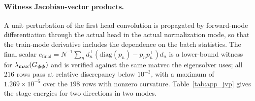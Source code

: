 \paragraph{Witness Jacobian-vector products.} A unit perturbation of the first
head convolution is propagated by forward-mode differentiation through the
actual head in the actual normalization mode, so that the train-mode derivative
includes the dependence on the batch statistics. The final scalar
$e_{\mathrm{final}} = N^{-1}\sum_n d_n^\top(\mathrm{diag}(p_n) - p_np_n^\top)d_n$
is a lower-bound witness for $\lambda_{\max}(G_{{\boldsymbol{\phi}}{\boldsymbol{\phi}}})$ and is verified
against the same matvec the eigensolver uses; all $216$ rows pass at relative
discrepancy below $10^{-3}$, with a maximum of $1.269 \times 10^{-5}$ over the
$198$ rows with nonzero curvature. Table~\ref{tab:app_jvp} gives the stage
energies for two directions in two modes.

